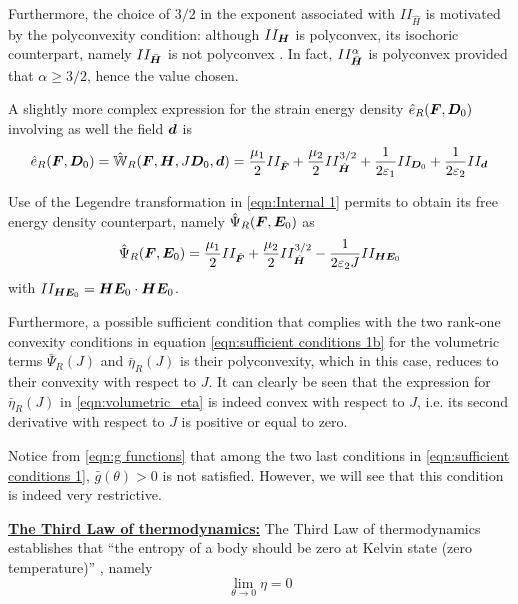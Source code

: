 Furthermore, the choice of $3/2$ in the exponent associated with $II_{\hat{H}}$ is motivated by the polyconvexity condition: although $II_{\boldsymbol{H}}$ is polyconvex, its isochoric counterpart, namely $II_{\bar{\boldsymbol{H}}}$ is not polyconvex . In fact, $II_{\bar{\boldsymbol{H}}}^{\alpha}$ is polyconvex provided that $\alpha\geq 3/2$, hence the value chosen.

A slightly more complex expression for the strain energy density $\hat{e}_R(\boldsymbol{F},\boldsymbol{D}_0)$ involving as well the field $\boldsymbol{d}$ is
%
\begin{equation}
	\hat{e}_R(\boldsymbol{F},\boldsymbol{D}_0) =  \hat{\mathbb{W}}_R(\boldsymbol{F},\boldsymbol{H},J\boldsymbol{D}_0,\boldsymbol{d})=\frac{\mu_1}{2}II_{\hat{\boldsymbol{F}}}+ \frac{\mu_2}{2}II^{3/2}_{\hat{\boldsymbol{H}}}
	+\frac{1}{2\varepsilon_1}II_{\boldsymbol{D}_0} + \frac{1}{2\varepsilon_2}II_{\boldsymbol{d}}
\end{equation}

Use of the Legendre transformation in \eqref{eqn:Internal 1} permits to obtain its free energy density counterpart, namely $\hat{\Psi}_R(\boldsymbol{F},\boldsymbol{E}_0)$ as
%
\begin{equation}
		\hat{\Psi}_R(\boldsymbol{F},\boldsymbol{E}_0)=\frac{\mu_1}{2}II_{\hat{\boldsymbol{F}}}+ \frac{\mu_2}{2}II^{3/2}_{\hat{\boldsymbol{H}}}
	- \frac{1}{2\varepsilon_2J}II_{\boldsymbol{HE}_0}	
\end{equation}
%
with $II_{\boldsymbol{HE}_0}	=\boldsymbol{HE}_0\cdot \boldsymbol{HE}_0$.



Furthermore, a possible sufficient condition that complies with the two rank-one convexity conditions in equation \eqref{eqn:sufficient conditions 1b} for the volumetric terms $\bar{\Psi}_{R}(J)$ and $\bar{\eta}_{R}(J)$ is their polyconvexity, which in this case, reduces to their convexity with respect to $J$. It can clearly be seen that the expression for $\bar{\eta}_R(J)$ in \eqref{eqn:volumetric_eta} is indeed convex with respect to $J$, i.e. its second derivative with respect to $J$ is positive or equal to zero.



Notice from \eqref{eqn:g functions} that among the two last conditions in \eqref{eqn:sufficient conditions 1}, $\bar{g}(\theta)>0$ is not satisfied. However, we will see that this condition is indeed very restrictive. 

\vspace{2mm}

\noindent \textbf{\underline{The Third Law of thermodynamics:}} The Third Law of thermodynamics establishes that “the entropy of a body should be zero at
Kelvin state (zero temperature)” , namely 
%
\begin{equation}
	\lim_{\theta \rightarrow 0} \eta   = 0
\end{equation}

